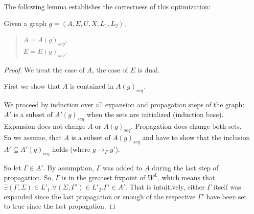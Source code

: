 \documentclass{llncs}
\begin{document}
The following lemma establishes the correctness of this optimization:

\begin{lemma}
Given a graph $g=(A,E,U,X,L_1,L_2)$,
\begin{quote}
$A=A(g)_{seq}$,\\
$E=E(g)_{seq}$.
\end{quote}
\begin{proof}
We treat the case of $A$, the case of $E$ is dual.

First we show that $A$ is contained in $A(g)_{seq}$.

We proceed by induction over all expansion and propagation steps of the graph:
$A'$ is a subset of $A'(g)_{seq}$ when the sets are initialized (induction base).
Expansion does not change $A$ or $A(g)_{seq}$. Propagation does change both sets.
So we assume, that $A$ is a subset of $A(g)_{seq}$ and have to show that the inclusion $A'\subseteq A'(g)_{seq}$
holds (where $g\rightarrow_P g'$).

So let $\Gamma\in A'$. By assumption, $\Gamma$ was added to $A$ during the last step of propagation.
So, $\Gamma$ is in the greatest fixpoint of $W^L$, which means that $\exists(\Gamma,\Sigma)\in L'_1.
\forall(\Sigma,\Gamma')\in L'_2.\Gamma'\in A'$. That is intuitively, either $\Gamma$ itself was expanded since the
last propagation or enough of the respective $\Gamma'$ have been set to true since the last propagation.


\end{proof}
\end{lemma}
\end{document}
